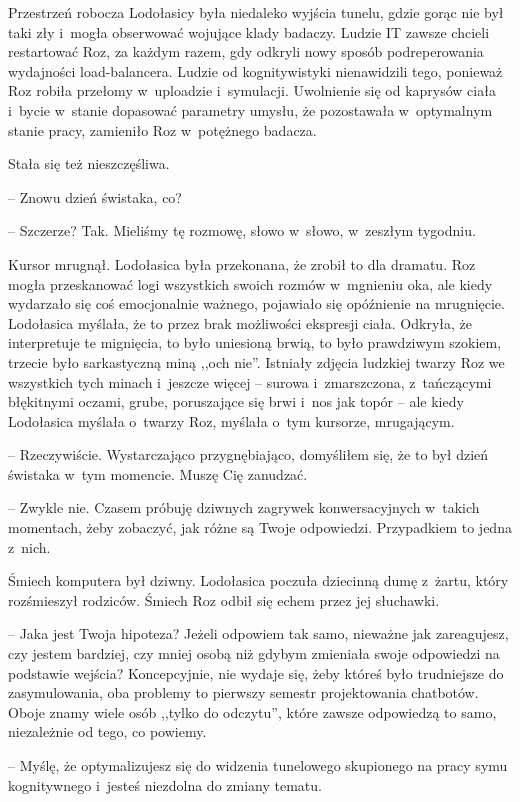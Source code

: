 \documentclass[oneside,polish,11pt,sfheadings]{mwbk}
\begin{document}
Przestrzeń robocza Lodołasicy była niedaleko wyjścia tunelu, gdzie gorąc
nie był taki zły i~mogła obserwować wojujące klady badaczy. Ludzie IT
zawsze chcieli restartować Roz, za każdym razem, gdy odkryli nowy sposób
podreperowania wydajności load-balancera. Ludzie od kognitywistyki
nienawidzili tego, ponieważ Roz robiła przełomy w~uploadzie i~symulacji.
Uwolnienie się od kaprysów ciała i~bycie w~stanie dopasować parametry
umysłu, że pozostawała w~optymalnym stanie pracy, zamieniło Roz w~potężnego badacza.

Stała się też nieszczęśliwa.

-- Znowu dzień świstaka, co?

-- Szczerze? Tak. Mieliśmy tę rozmowę, słowo w~słowo, w~zeszłym tygodniu.

Kursor mrugnął. Lodołasica była przekonana, że zrobił to dla dramatu.
Roz mogła przeskanować logi wszystkich swoich rozmów w~mgnieniu oka, ale
kiedy wydarzało się coś emocjonalnie ważnego, pojawiało się opóźnienie
na mrugnięcie. Lodołasica myślała, że to przez brak możliwości ekspresji
ciała. Odkryła, że interpretuje te mignięcia, to było uniesioną brwią,
to było prawdziwym szokiem, trzecie było sarkastyczną miną ,,och nie''.
Istniały zdjęcia ludzkiej twarzy Roz we wszystkich tych minach i~jeszcze
więcej -- surowa i~zmarszczona, z~tańczącymi błękitnymi oczami, grube,
poruszające się brwi i~nos jak topór -- ale kiedy Lodołasica myślała o~twarzy Roz, myślała o~tym kursorze, mrugającym.

-- Rzeczywiście. Wystarczająco przygnębiająco, domyśliłem się, że to był
dzień świstaka w~tym momencie. Muszę Cię zanudzać.

-- Zwykle nie. Czasem próbuję dziwnych zagrywek konwersacyjnych w~takich
momentach, żeby zobaczyć, jak różne są Twoje odpowiedzi. Przypadkiem to
jedna z~nich.

Śmiech komputera był dziwny. Lodołasica poczuła dziecinną dumę z~żartu,
który rozśmieszył rodziców. Śmiech Roz odbił się echem przez jej
słuchawki. 

-- Jaka jest Twoja hipoteza? Jeżeli odpowiem tak samo,
nieważne jak zareagujesz, czy jestem bardziej, czy mniej osobą niż
gdybym zmieniała swoje odpowiedzi na podstawie wejścia? Koncepcyjnie,
nie wydaje się, żeby któreś było trudniejsze do zasymulowania, oba
problemy to pierwszy semestr projektowania chatbotów. Oboje znamy wiele
osób ,,tylko do odczytu'', które zawsze odpowiedzą to samo, niezależnie
od tego, co powiemy.

-- Myślę, że optymalizujesz się do widzenia tunelowego skupionego na
pracy symu kognitywnego i~jesteś niezdolna do zmiany tematu.
\end{document}
